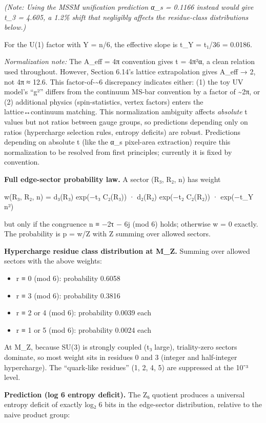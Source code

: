 \documentclass[
]{article}
\providecommand{\tightlist}{%
  \setlength{\itemsep}{0pt}\setlength{\parskip}{0pt}}
\begin{document}
\emph{(Note: Using the MSSM unification prediction α\_s = 0.1166 instead
would give t\_3 = 4.605, a 1.2\% shift that negligibly affects the
residue-class distributions below.)}

For the U(1) factor with Y = n/6, the effective slope is t\_Y = t₁/36 =
0.0186.

\emph{Normalization note:} The A\_eff = 4π convention gives t = 4π²α, a
clean relation used throughout. However, Section 6.14's lattice
extrapolation gives A\_eff → 2, not 4π ≈ 12.6. This
factor-of-\textasciitilde6 discrepancy indicates either: (1) the toy UV
model's ``g²'' differs from the continuum MS-bar convention by a factor
of \textasciitilde2π, or (2) additional physics (spin-statistics, vertex
factors) enters the lattice↔continuum matching. This normalization
ambiguity affects \emph{absolute} t values but not ratios between gauge
groups, so predictions depending only on ratios (hypercharge selection
rules, entropy deficits) are robust. Predictions depending on absolute t
(like the α\_s pixel-area extraction) require this normalization to be
resolved from first principles; currently it is fixed by convention.

\textbf{Full edge-sector probability law.} A sector (R₃, R₂, n) has
weight

w(R₃, R₂, n) = d₃(R₃) exp(−t₃ C₂(R₃)) · d₂(R₂) exp(−t₂ C₂(R₂)) ·
exp(−t\_Y n²)

but only if the congruence n ≡ −2τ − 6j (mod 6) holds; otherwise w = 0
exactly. The probability is p = w/Z with Z summing over allowed sectors.

\textbf{Hypercharge residue class distribution at M\_Z.} Summing over
allowed sectors with the above weights:

\begin{itemize}
\tightlist
\item
  r ≡ 0 (mod 6): probability 0.6058
\item
  r ≡ 3 (mod 6): probability 0.3816
\item
  r ≡ 2 or 4 (mod 6): probability 0.0039 each
\item
  r ≡ 1 or 5 (mod 6): probability 0.0024 each
\end{itemize}

At M\_Z, because SU(3) is strongly coupled (t₃ large), triality-zero
sectors dominate, so most weight sits in residues 0 and 3 (integer and
half-integer hypercharge). The ``quark-like residues'' (1, 2, 4, 5) are
suppressed at the 10⁻³ level.

\textbf{Prediction (log 6 entropy deficit).} The Z₆ quotient produces a
universal entropy deficit of exactly log₂ 6 bits in the edge-sector
distribution, relative to the naive product group:
\end{document}
